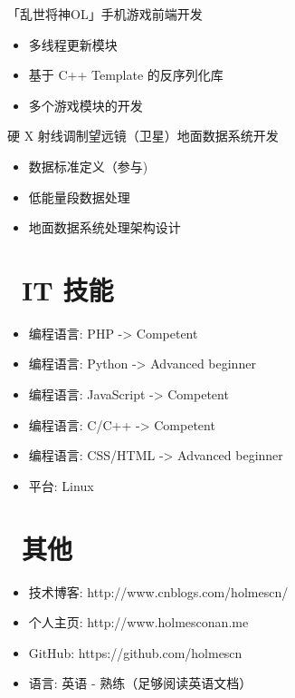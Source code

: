 \documentclass{resume}
\begin{document}
\begin{onehalfspacing}
「乱世将神OL」手机游戏前端开发
\begin{itemize}
  \item 多线程更新模块
  \item 基于 C++ Template 的反序列化库
  \item 多个游戏模块的开发
\end{itemize}
\end{onehalfspacing}

硬 X 射线调制望远镜（卫星）地面数据系统开发
\begin{itemize}
  \item 数据标准定义（参与)
  \item 低能量段数据处理
  \item 地面数据系统处理架构设计
\end{itemize}


\section{\faCogs\ IT 技能}
\begin{itemize}[parsep=0.5ex]
  \item 编程语言: PHP -> Competent
  \item 编程语言: Python -> Advanced beginner
  \item 编程语言: JavaScript -> Competent
  \item 编程语言: C/C++ -> Competent
  \item 编程语言: CSS/HTML -> Advanced beginner
  \item 平台: Linux
\end{itemize}

\section{\faInfo\ 其他}
\begin{itemize}[parsep=0.5ex]
  \item 技术博客: http://www.cnblogs.com/holmescn/
  \item 个人主页: http://www.holmesconan.me
  \item GitHub: https://github.com/holmescn
  \item 语言: 英语 - 熟练（足够阅读英语文档）
\end{itemize}

%
%
\end{document}
